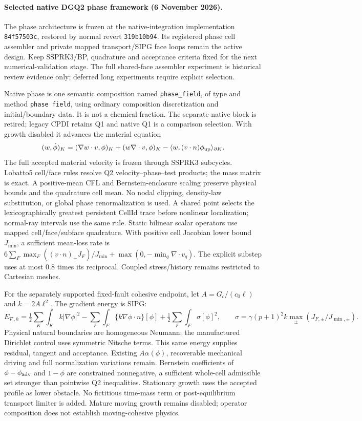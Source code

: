 \documentclass[11pt]{article}
\begin{document}
\paragraph{Selected native DGQ2 phase framework (6 November 2026).}
The phase architecture is frozen at the native-integration implementation
\texttt{84f57503c}, restored by normal revert \texttt{319b10b94}.
Its registered phase cell assembler and private mapped transport/SIPG face
loops remain the active design. Keep SSPRK3/BP, quadrature and acceptance
criteria fixed for the next numerical-validation stage. The full shared-face
assembler experiment is historical review evidence only; deferred long
experiments require explicit selection.

Native phase is one semantic composition named \texttt{phase\_field}, of type
and method \texttt{phase field}, using ordinary composition discretization and
initial/boundary data. It is not a chemical fraction. The separate native block
is retired; legacy CPDI retains Q1 and native Q1 is a comparison selection.
With growth disabled it advances the material equation
\[
 (w,\dot\phi)_K=(\nabla w\cdot v,\phi)_K+(w\nabla\cdot v,\phi)_K
 -\langle w,(v\cdot n)\phi_{\rm up}\rangle_{\partial K}.
\]
The full accepted material velocity is frozen through SSPRK3 subcycles.
Lobatto5 cell/face rules resolve Q2 velocity--phase--test products; the mass
matrix is exact. A positive-mean CFL and Bernstein-enclosure scaling preserve
physical bounds and the quadrature cell mean. No nodal clipping, density-law
substitution, or global phase renormalization is used. A shared point selects
the lexicographically greatest persistent CellId trace before nonlinear
localization; normal-ray intervals use the same rule. Static bilinear scalar
operators use mapped cell/face/subface quadrature. With positive cell Jacobian
lower bound $J_{\min}$, a sufficient mean-loss rate is
$6\sum_F\max_F((v\cdot n)_+J_F)/J_{\min}+\max(0,-\min_q\nabla\cdot v_q)$.
The explicit substep uses at most 0.8 times its reciprocal.
Coupled stress/history remains restricted to Cartesian meshes.

For the separately supported fixed-fault cohesive endpoint, let
$A=G_c/(c_0\ell)$ and $k=2A\ell^2$. The gradient energy is SIPG:
\[
 E_{\nabla,h}=\tfrac12\sum_K\int_K k|\nabla\phi|^2
 -\sum_F\int_F\{k\nabla\phi\cdot n\}[\phi]
 +\tfrac12\sum_F\int_F\sigma[\phi]^2,
 \qquad \sigma=\gamma(p+1)^2k\max_{\pm}(J_{F,\pm}/J_{\min,\pm}).
\]
Physical natural boundaries are homogeneous Neumann; the manufactured Dirichlet
control uses symmetric Nitsche terms. This same energy supplies residual,
tangent and acceptance. Existing $A\alpha(\phi)$, recoverable mechanical driving
and full normalization variations remain. Bernstein coefficients of
$\phi-\phi_{\rm adv}$ and $1-\phi$ are constrained nonnegative, a sufficient
whole-cell admissible set stronger than pointwise Q2 inequalities. Stationary
growth uses the accepted profile as lower obstacle. No fictitious time-mass
term or post-equilibrium transport limiter is added. Mature moving growth
remains disabled; operator composition does not establish moving-cohesive physics.
\end{document}
